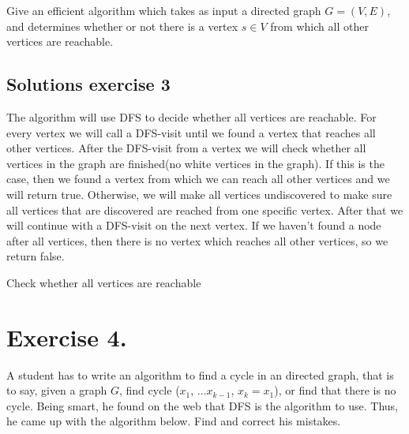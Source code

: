 \documentclass{article}
\begin{document}
Give an efficient algorithm which takes as input a directed graph $G = (V,E)$, and determines whether or not
there is a vertex $s \in V$ from which all other vertices are reachable.

\subsection*{Solutions exercise 3}
The algorithm will use DFS to decide whether all vertices are reachable. For every vertex we will call a DFS-visit until we found a vertex that reaches all other vertices. After the DFS-visit from a vertex we will check whether all vertices in the graph are finished(no white vertices in the graph). If this is the case, then we found a vertex from which we can reach all other vertices and we will return true. Otherwise, we will make all vertices undiscovered to make sure all vertices that are discovered are reached from one specific vertex. After that we will continue with a DFS-visit on the next vertex. If we haven't found a node after all vertices, then there is no vertex which reaches all other vertices, so we return false.
\begin{algorithm}[ht!]
  \DontPrintSemicolon

    \caption{Check whether all vertices are reachable}
\end{algorithm}



\newpage
\section*{Exercise 4.}
A student has to write an algorithm to find a cycle in an directed graph, that is to say, given a graph $G$, find cycle ($x_1$, $\ldots x_{k-1}$, $x_k = x_1$), or find that there is no cycle.
Being smart, he found on the web that DFS is the algorithm to use. Thus, he came up with the algorithm below. Find and correct his mistakes.
\end{document}
